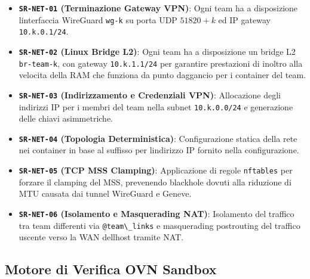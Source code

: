\begin{itemize}
\tightlist
\item
  \textbf{\passthrough{\lstinline!SR-NET-01!} (Terminazione Gateway
  VPN)}: Ogni team ha a disposizione l\textquotesingle interfaccia
  WireGuard \passthrough{\lstinline!wg-k!} su porta UDP \(51820+k\) ed
  IP gateway \passthrough{\lstinline!10.k.0.1/24!}.
\item
  \textbf{\passthrough{\lstinline!SR-NET-02!} (Linux Bridge L2)}: Ogni
  team ha a disposizione un bridge L2
  \passthrough{\lstinline!br-team-k!}, con gateway
  \passthrough{\lstinline!10.k.1.1/24!} per garantire prestazioni di
  inoltro alla velocita della RAM che funziona da punto
  d\textquotesingle aggancio per i container del team.
\item
  \textbf{\passthrough{\lstinline!SR-NET-03!} (Indirizzamento e
  Credenziali VPN)}: Allocazione degli indirizzi IP per i membri del
  team nella subnet \passthrough{\lstinline!10.k.0.0/24!} e generazione
  delle chiavi asimmetriche.
\item
  \textbf{\passthrough{\lstinline!SR-NET-04!} (Topologia
  Deterministica)}: Configurazione statica della rete nei container in
  base al suffisso per l\textquotesingle indirizzo IP fornito nella
  configurazione.
\item
  \textbf{\passthrough{\lstinline!SR-NET-05!} (TCP MSS Clamping)}:
  Applicazione di regole \passthrough{\lstinline!nftables!} per forzare
  il clamping del MSS, prevenendo blackhole dovuti alla riduzione di MTU
  causata dai tunnel WireGuard e Geneve.
\item
  \textbf{\passthrough{\lstinline!SR-NET-06!} (Isolamento e Masquerading
  NAT)}: Isolamento del traffico tra team differenti via
  \passthrough{\lstinline!@team\_links!} e masquerading postrouting del
  traffico uscente verso la WAN dell\textquotesingle host tramite NAT.
\end{itemize}

\subsection{Motore di Verifica OVN
Sandbox}\label{motore-di-verifica-ovn-sandbox}

